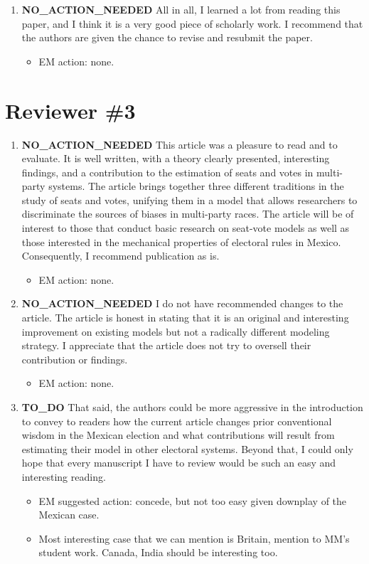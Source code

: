 \documentclass{article}
\begin{document}
\begin{enumerate}
\begin{itemize}
\end{itemize}
\item {\bfseries\sffamily NO\_ACTION\_NEEDED} All in all, I learned a lot from reading this paper, and I think it is a very good piece of scholarly work. I recommend that the authors are given the chance to revise and resubmit the paper.
\label{sec:orgheadline15}
\begin{itemize}
\item EM action: none.
\end{itemize}
\end{enumerate}

\section{Reviewer \#3}
\label{sec:orgheadline20}
\begin{enumerate}
\item {\bfseries\sffamily NO\_ACTION\_NEEDED} This article was a pleasure to read and to evaluate. It is well written, with a theory clearly presented, interesting findings, and a contribution to the estimation of seats and votes in multi-party systems. The article brings together three different traditions in the study of seats and votes, unifying them in a model that allows researchers to discriminate the sources of biases in multi-party races. The article will be of interest to those that conduct basic research on seat-vote models as well as those interested in the mechanical properties of electoral rules in Mexico. Consequently, I recommend publication as is.
\label{sec:orgheadline17}
\begin{itemize}
\item EM action: none.
\end{itemize}
\item {\bfseries\sffamily NO\_ACTION\_NEEDED} I do not have recommended changes to the article. The article is honest in stating that it is an original and interesting improvement on existing models but not a radically different modeling strategy. I appreciate that the article does not try to oversell their contribution or findings.
\label{sec:orgheadline18}
\begin{itemize}
\item EM action: none.
\end{itemize}
\item {\bfseries\sffamily TO\_DO} That said, the authors could be more aggressive in the introduction to convey to readers how the current article changes prior conventional wisdom in the Mexican election and what contributions will result from estimating their model in other electoral systems. Beyond that, I could only hope that every manuscript I have to review would be such an easy and interesting reading.
\label{sec:orgheadline19}
\begin{itemize}
\item EM suggested action: concede, but not too easy given downplay of the Mexican case.
\item Most interesting case that we can mention is Britain, mention to MM's student work. Canada, India should be interesting too.
\end{itemize}
\end{enumerate}
\end{document}
